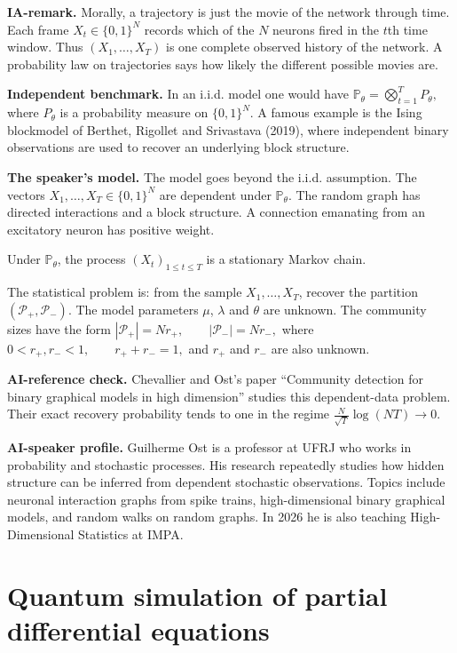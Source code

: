 \medskip\noindent
{\bf IA-remark.}
Morally, a trajectory is just the movie of
the network through time. Each frame
$X_t\in\{0,1\}^N$ records which of the
$N$ neurons fired in the $t$th time
window. Thus
$
(X_1,\ldots,X_T)
$
is one complete observed history of the
network. A probability law on trajectories
says how likely the different possible
movies are.

\medskip\noindent
{\bf Independent benchmark.}
In an i.i.d. model one would have
$
\mathbb{P}_\theta
=\bigotimes_{t=1}^T P_\theta,
$
where $P_\theta$ is a probability measure
on $\{0,1\}^N$. A famous example is the
Ising blockmodel of Berthet, Rigollet and
Srivastava (2019), where independent
binary observations are used to recover
an underlying block structure.

\medskip\noindent
{\bf The speaker's model.}
The model goes beyond the i.i.d.
assumption. The vectors
$
X_1,\ldots,X_T\in\{0,1\}^N
$
are dependent under
$\mathbb{P}_\theta$. The random graph has
directed interactions and a block
structure. A connection emanating from an
excitatory neuron has positive weight.

Under $\mathbb{P}_\theta$, the process
$
(X_t)_{1\leq t\leq T}
$
is a stationary Markov chain.

The statistical problem is: from the
sample $X_1,\ldots,X_T$, recover the
partition
$
(\mathcal{P}_+,\mathcal{P}_-).
$
The model parameters $\mu$, $\lambda$ and
$\theta$ are unknown. The community sizes
have the form
$
|\mathcal{P}_+|=Nr_+,
\qquad
|\mathcal{P}_-|=Nr_-,
$
where
$
0<r_+,r_-<1,
\qquad
r_++r_-=1,
$
and $r_+$ and $r_-$ are also unknown.

\medskip\noindent
{\bf AI-reference check.}
Chevallier and Ost's paper
``Community detection for binary graphical
models in high dimension'' studies this
dependent-data problem. Their exact
recovery probability tends to one in the
regime
$
\frac{N}{\sqrt{T}}\log(NT)\longrightarrow0.
$

\medskip\noindent
{\bf AI-speaker profile.}
Guilherme Ost is a professor at UFRJ who
works in probability and stochastic
processes. His research repeatedly studies
how hidden structure can be inferred from
dependent stochastic observations. Topics
include neuronal interaction graphs from
spike trains, high-dimensional binary
graphical models, and random walks on
random graphs. In 2026 he is also teaching
High-Dimensional Statistics at IMPA.

\section{Quantum simulation of partial
differential equations}
\label{section-liu-quantum-simulation}


